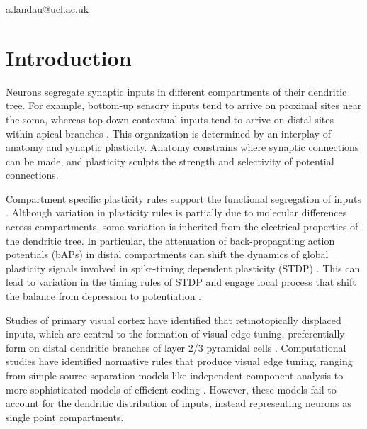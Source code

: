 \begin{corrauthor}
a.landau@ucl.ac.uk
\end{corrauthor}

\section*{Introduction}\label{s:introduction}

Neurons segregate synaptic inputs in different compartments of their dendritic tree. For example, bottom-up sensory inputs tend to arrive on proximal sites near the soma, whereas top-down contextual inputs tend to arrive on distal sites within apical branches \citep{andersonSynapticConnectionsCortical2009, iacarusoSynapticOrganizationVisual2017, petreanuSubcellularOrganizationNeocortical2009, andersenHippocampusBook2006}. This organization is determined by an interplay of anatomy and synaptic plasticity. Anatomy constrains where synaptic connections can be made, and plasticity sculpts the strength and selectivity of potential connections. 

Compartment specific plasticity rules support the functional segregation of inputs \citep{wrightDistinctSynapticPlasticity2025, sprustonPyramidalNeuronsDendritic2008, goldingDendriticSpikesMechanism2002, cichonBranchspecificDendriticCa22015, gambinoSensoryevokedLTPDriven2014}. Although variation in plasticity rules is partially due to molecular differences across compartments, some variation is inherited from the electrical properties of the dendritic tree. In particular, the attenuation of back-propagating action potentials (bAPs) in distal compartments can shift the dynamics of global plasticity signals involved in spike-timing dependent plasticity (STDP) \citep{froemkeSpiketimingdependentSynapticPlasticity2005}. This can lead to variation in the timing rules of STDP \citep{froemkeSpiketimingdependentSynapticPlasticity2005} and engage local process that shift the balance from depression to potentiation \citep{sjostromCooperativeSwitchDetermines2006}.

Studies of primary visual cortex have identified that retinotopically displaced inputs, which are central to the formation of visual edge tuning, preferentially form on distal dendritic branches of layer 2/3 pyramidal cells \citep{iacarusoSynapticOrganizationVisual2017, lempelDevelopmentCoherentCortical2025}. Computational studies have identified normative rules that produce visual edge tuning, ranging from simple source separation models like independent component analysis to more sophisticated models of efficient coding \citep{olshausenEmergenceSimplecellReceptive1996, bellInformationMaximizationApproachBlind1999}. However, these models fail to account for the dendritic distribution of inputs, instead representing neurons as single point compartments.

